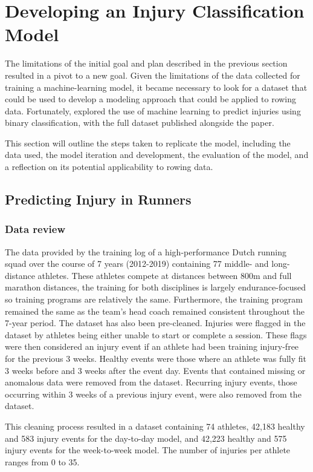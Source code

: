 \section{Developing an Injury Classification Model}
The limitations of the initial goal and plan described in the previous section resulted in a pivot to a new goal. Given the limitations of the data collected for training a machine-learning model, it became necessary to look for a dataset that could be used to develop a modeling approach that could be applied to rowing data. Fortunately, \textcite{Lovdal2021} explored the use of machine learning to predict injuries using binary classification, with the full dataset published alongside the paper. 

This section will outline the steps taken to replicate the model, including the data used, the model iteration and development, the evaluation of the model, and a reflection on its potential applicability to rowing data.

\subsection{Predicting Injury in Runners}
\subsubsection{Data review}
The data provided by \textcite{Lovdal2021} the training log of a high-performance Dutch running squad over the course of 7 years (2012-2019) containing 77 middle- and long-distance athletes. These athletes compete at distances between 800m and full marathon distances, the training for both disciplines is largely endurance-focused so training programs are relatively the same. Furthermore, the training program remained the same as the team's head coach remained consistent throughout the 7-year period. The dataset has also been pre-cleaned. Injuries were flagged in the dataset by athletes being either unable to start or complete a session. These flags were then considered an injury event if an athlete had been training injury-free for the previous 3 weeks. Healthy events were those where an athlete was fully fit 3 weeks before and 3 weeks after the event day. Events that contained missing or anomalous data were removed from the dataset. Recurring injury events, those occurring within 3 weeks of a previous injury event, were also removed from the dataset.

This cleaning process resulted in a dataset containing 74 athletes, 42,183 healthy and 583 injury events for the day-to-day model, and 42,223 healthy and 575 injury events for the week-to-week model. The number of injuries per athlete ranges from 0 to 35.

